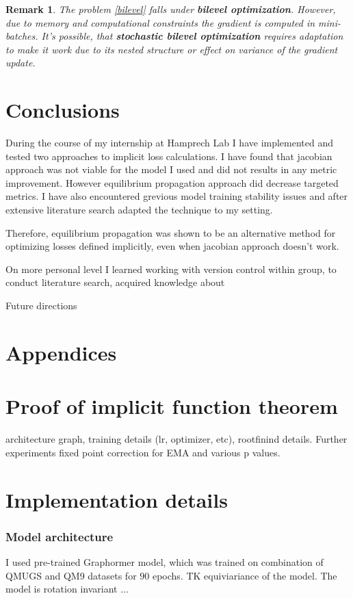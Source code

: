 \documentclass[a4paper,10pt]{report}
\newtheorem{remark}{Remark}
\begin{document}
\begin{remark}
 The problem \ref{bilevel} falls under \textbf{bilevel optimization}. However, due to memory and computational constraints the gradient is computed in mini-batches. It's possible, that \textbf{stochastic bilevel optimization} requires adaptation to make it work due to its nested structure or effect on variance of the gradient update.
\end{remark}
\newpage
\section{Conclusions}
During the course of my internship at Hamprech Lab I have implemented and tested two approaches to implicit loss calculations. I have found that jacobian approach was not viable for the model I used and did not results in any metric improvement.
However equilibrium propagation approach did decrease targeted metrics. I have also encountered grevious model training stability issues and after extensive literature search adapted the technique to my setting.

Therefore, equilibrium propagation was shown to be an alternative method for optimizing losses defined implicitly, even when jacobian approach doesn't work.

On more personal level I learned working with version control within group, to conduct literature search, acquired knowledge about

Future directions
\nocite{*}




\section{Appendices}



\appendix
\section{Proof of implicit function theorem}

architecture graph, training details (lr, optimizer, etc), rootfinind details.
Further experiments
fixed point correction for EMA and various p values.
\appendix
\section{Implementation details} \label{sec:impl}

\subsubsection{Model architecture}
I used pre-trained Graphormer model, which was trained on combination of QMUGS and QM9 datasets for $90$ epochs.
TK equiviariance of the model.
The model is rotation invariant ...
\end{document}
